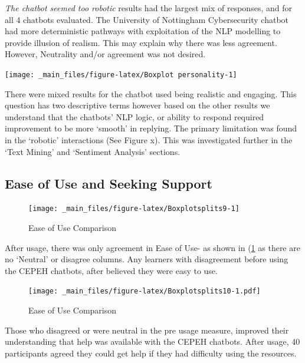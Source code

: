 \documentclass[a4paper, nobind]{templates/ociamthesis}
\begin{document}
\emph{The chatbot seemed too robotic} results had the largest mix of
responses, and for all 4 chatbots evaluated. The University of
Nottingham Cybersecurity chatbot had more deterministic pathways with
exploitation of the NLP modelling to provide illusion of realism. This
may explain why there was less agreement. However, Neutrality and/or
agreement was not desired.

\begin{center}\texttt{[image: \_main\_files/figure-latex/Boxplot personality-1]} \end{center}

There were mixed results for the chatbot used being realistic and engaging. This question has two descriptive terms however based on the other results we understand that the chatbots' NLP logic, or ability to respond required improvement to be more `smooth' in replying. The primary limitation was found in the `robotic' interactions (See Figure x). This was
investigated further in the `Text Mining' and `Sentiment Analysis' sections.

\hypertarget{ease-of-use-and-seeking-support}{%
\subsection{Ease of Use and Seeking Support}\label{ease-of-use-and-seeking-support}}

\begin{figure}

{\centering \texttt{[image: \_main\_files/figure-latex/Boxplotsplits9-1]} 

}

\caption{Ease of Use Comparison}\label{fig:Boxplotsplits9}
\end{figure}

After usage, there was only agreement in Ease of Use- as shown in
(\ref{fig:Boxplotsplits9} as there are no `Neutral' or disagree
columns. Any learners with disagreement before using the CEPEH chatbots,
after believed they were easy to use.

\begin{figure}
\centering
\texttt{[image: \_main\_files/figure-latex/Boxplotsplits10-1.pdf]}
\caption{\label{fig:Boxplotsplits10}Ease of Use Comparison}
\end{figure}

Those who disagreed or were neutral in the pre usage measure, improved
their understanding that help was available with the CEPEH chatbots.
After usage, 40 participants agreed they could get help if they had
difficulty using the resources.
\end{document}
